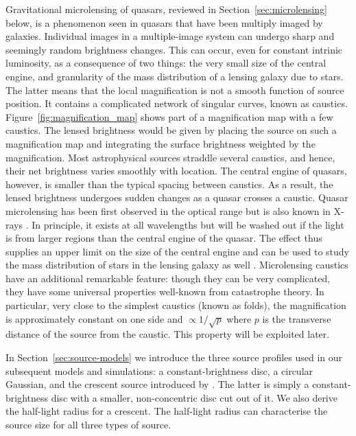 \documentclass[usenatbib]{mn2e}
\begin{document}
Gravitational microlensing of quasars, reviewed in
Section~\ref{sec:microlensing} below, is a phenomenon seen in quasars
that have been multiply imaged by galaxies.  Individual images in a
multiple-image system can undergo sharp and seemingly random
brightness changes.  This can occur, even for constant intrinic
luminosity, as a consequence of two things: the very small size of the
central engine, and granularity of the mass distribution of a lensing
galaxy due to stars.  The latter means that the local magnification is
not a smooth function of source position. It contains a complicated
network of singular curves, known as caustics.
Figure~\ref{fig:magnification_map} shows part of a magnification map
with a few caustics.  The lensed brightness would be given by placing
the source on such a magnification map and integrating the surface
brightness weighted by the magnification.  Most astrophysical sources
straddle several caustics, and hence, their net brightness varies
smoothly with location.  The central engine of quasars, however, is
smaller than the typical spacing between caustics.  As a result, the
lensed brightness undergoes sudden changes as a quasar crosses a
caustic.  Quasar microlensing has been first observed in the optical
range \citep[e.g.,][]{2012A&A...544A..62S} but is also known in
X-rays \citep[e.g.,][]{2016arXiv160207601N}.  In principle, it exists
at all wavelengths \citep[and has been argued for at cm wavelengths
  by][]{2000A&A...358..793K} but will be washed out if the light is
from larger regions than the central engine of the quasar.  The effect
thus supplies an upper limit on the size of the central engine
\citep[e.g.,][]{2015ApJ...814L..26M} and can be used to study the mass
distribution of stars in the lensing galaxy as well
\citep[e.g.,][]{2012ApJ...744..111P}.  Microlensing caustics have an
additional remarkable feature: though they can be very complicated,
they have some universal properties well-known from catastrophe
theory.  In particular, very close to the simplest caustics (known as
folds), the magnification is approximately constant on one side and
$\propto1/\sqrt p$ where $p$ is the transverse distance of the source
from the caustic.  This property will be exploited later.

In Section~\ref{sec:source-models} we introduce the three source
profiles used in our subsequent models and simulations: a
constant-brightness disc, a circular Gaussian, and the crescent source
introduced by \cite{2013MNRAS.434..765K}.  The latter is simply a
constant-brightness disc with a smaller, non-concentric disc cut out
of it.  We also derive the half-light radius for a crescent.  The
half-light radius can characterise the source size for all three types
of source.
\end{document}

